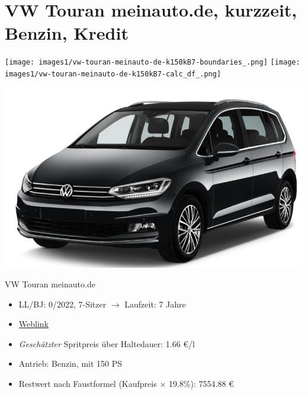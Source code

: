 \documentclass[landscape, DIV=99, 14pt]{scrartcl}
\begin{document}
\pagebreak


\twocolumn

\section*{VW Touran meinauto.de, kurzzeit, Benzin, Kredit}
\begin{center}
\texttt{[image: images1/vw-touran-meinauto-de-k150kB7-boundaries\_.png]}
\null
\vspace{0.5cm}
\texttt{[image: images1/vw-touran-meinauto-de-k150kB7-calc\_df\_.png]}
\end{center}

\pagebreak
\begin{center}
\includegraphics[width=0.9\columnwidth]{cars/vw-touran.png}

VW Touran meinauto.de
\end{center}

\begin{itemize}
    \item LL/BJ: 0/2022, 7-Sitzer $\rightarrow$ Laufzeit: 7 Jahre
    \item \href{https://www.volkswagen.de/de/konfigurator.html/__app/touran/touran/comfortline.app?buildabilityStatus-app=buildable&category-app=private&carlineId-app=31000&salesGroupId-app=32600&trimName-app=Comfortline&modelId-app=5T13PZ%24GYORYOR&modelVersion-app=3&modelYear-app=2022&exteriorId-app=F14+5K5K&interiorId-app=F56+++++VE&options-app=MSTD7B2-GPG4PG4-MESSU9C-GPJ9PJ9-GPF6PF6-GPKJPKJ-GPLLPLL-MHKAKH7-GWLLWLL-GWL2WL2-GPM3PM3-GRBDRBD-MTRW3CX-MKSUKA1-MSAB4X4-GP19P19-GWQ1WQ1-GWWCWWC}{Weblink}
    \item \emph{Gesch\"atzter} Spritpreis \"uber Haltedauer: 1.66 \euro{}/l
    \item Antrieb: Benzin, mit 150 PS
    \item Restwert nach Faustformel (Kaufpreis $\times$ 19.8\%): 7554.88 \euro{}
\end{itemize}
\end{document}
